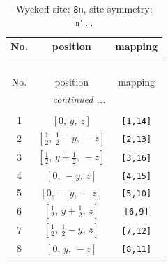 \documentclass[fleqn,8pt]{jsarticle}
\begin{document}
\begin{longtable}{ccc}
\caption{Wyckoff site: {\tt 8n}, site symmetry: {\tt m'..}}
 \\
 \hline \hline
No. & position & mapping \\ \hline \endfirsthead

\multicolumn{2}{l}{\tablename\ \thetable{}} \\
 \hline \hline
No. & position & mapping \\ \hline \endhead

 \hline \hline
\multicolumn{2}{r}{\footnotesize\it continued ...} \\ \endfoot

 \hline \hline
\multicolumn{2}{r}{} \\ \endlastfoot

1 & $\left[ 0,\, y,\, z \right]$ & {\tt [1,14]} \\ \hline
2 & $\left[ \frac{1}{2},\, \frac{1}{2} - y,\, - z \right]$ & {\tt [2,13]} \\ \hline
3 & $\left[ \frac{1}{2},\, y + \frac{1}{2},\, - z \right]$ & {\tt [3,16]} \\ \hline
4 & $\left[ 0,\, - y,\, z \right]$ & {\tt [4,15]} \\ \hline
5 & $\left[ 0,\, - y,\, - z \right]$ & {\tt [5,10]} \\ \hline
6 & $\left[ \frac{1}{2},\, y + \frac{1}{2},\, z \right]$ & {\tt [6,9]} \\ \hline
7 & $\left[ \frac{1}{2},\, \frac{1}{2} - y,\, z \right]$ & {\tt [7,12]} \\ \hline
8 & $\left[ 0,\, y,\, - z \right]$ & {\tt [8,11]} \\
\end{longtable}
\renewcommand{\arraystretch}{1.2}
\end{document}

